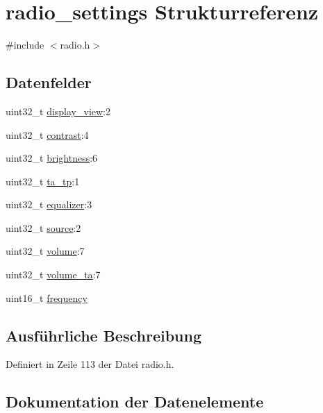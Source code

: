 \hypertarget{structradio__settings}{}\section{radio\+\_\+settings Strukturreferenz}
\label{structradio__settings}


{\ttfamily \#include $<$radio.\+h$>$}

\subsection*{Datenfelder}
\begin{DoxyCompactItemize}
\item 
uint32\+\_\+t \hyperlink{structradio__settings_ab883cb36a9863c8e478492bbf458b132}{display\+\_\+view}\+:2
\item 
uint32\+\_\+t \hyperlink{structradio__settings_a1e8cada2158820574507a1ca0989812d}{contrast}\+:4
\item 
uint32\+\_\+t \hyperlink{structradio__settings_af4cd243fe91e6ef111857d8d7938707f}{brightness}\+:6
\item 
uint32\+\_\+t \hyperlink{structradio__settings_a104f6012667fb7152790a5a6f55c7781}{ta\+\_\+tp}\+:1
\item 
uint32\+\_\+t \hyperlink{structradio__settings_ae8e4d5261bb2829f7dcec9b4b9315424}{equalizer}\+:3
\item 
uint32\+\_\+t \hyperlink{structradio__settings_acced9a05ed6f381d74d67de65d66fa3b}{source}\+:2
\item 
uint32\+\_\+t \hyperlink{structradio__settings_ae2b7935b01cdfe9a81d408dc3f2431f1}{volume}\+:7
\item 
uint32\+\_\+t \hyperlink{structradio__settings_a22b4bf888b705c01b6914d4caaed08dd}{volume\+\_\+ta}\+:7
\item 
uint16\+\_\+t \hyperlink{structradio__settings_aea762e0e67fcafaf5b3cd61201769926}{frequency}
\end{DoxyCompactItemize}


\subsection{Ausführliche Beschreibung}


Definiert in Zeile 113 der Datei radio.\+h.



\subsection{Dokumentation der Datenelemente}
\hypertarget{structradio__settings_af4cd243fe91e6ef111857d8d7938707f}{}
